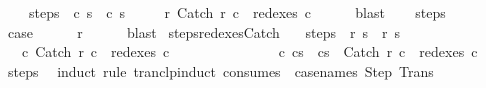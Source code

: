 \begin{isabellebody}
\ \ \ \ steps{\isacharcolon}\ {\isachardoublequoteopen}{\isasymGamma}{\isasymturnstile}\ {\isacharparenleft}c{\isacharprime}{\isacharcomma}\ s{\isacharprime}{\isacharprime}{\isacharparenright}\ {\isasymrightarrow}\isactrlsup {\isacharasterisk}\ {\isacharparenleft}c{\isacharprime}{\isacharprime}{\isacharcomma}\ s{\isacharprime}{\isacharparenright}{\isachardoublequoteclose}\ \isanewline
\ \ \ \ r{\isacharprime}{\isacharcolon}\ {\isachardoublequoteopen}Catch\ r{\isacharprime}\ c\ {\isasymin}\ redexes\ c{\isacharprime}{\isacharprime}{\isachardoublequoteclose}\isanewline
\ \ \ \ \isamarkupfalse%
\ blast\isanewline
\ \ \isamarkupfalse%
\ steps\isanewline
\ \ \isamarkupfalse%
\isanewline
\ \ \isamarkupfalse%
\ {\isacharquery}case\isanewline
\ \ \ \ \isamarkupfalse%
\ r{\isacharprime}\isanewline
\ \ \ \ \isamarkupfalse%
\ blast\isanewline
{}\isamarkupfalse%
%
\endisatagproof
{\isafoldproof}%
%
\isadelimproof
\isanewline
%
\endisadelimproof
\isanewline
{}\isamarkupfalse%
\ steps{\isacharunderscore}redexes{\isacharunderscore}Catch{\isacharprime}{\isacharcolon}\isanewline
\ \ \ steps{\isacharcolon}\ {\isachardoublequoteopen}{\isasymGamma}{\isasymturnstile}\ {\isacharparenleft}r{\isacharcomma}\ s{\isacharparenright}\ {\isasymrightarrow}\isactrlsup {\isacharplus}\ {\isacharparenleft}r{\isacharprime}{\isacharcomma}\ s{\isacharprime}{\isacharparenright}{\isachardoublequoteclose}\isanewline
\ \ \ {\isachardoublequoteopen}{\isasymAnd}c{\isachardot}\ Catch\ r\ c\ {\isasymin}\ redexes\ c\ \isanewline
\ \ \ \ \ \ \ \ \ \ \ \ \ {\isasymLongrightarrow}\ {\isasymexists}c{\isacharprime}{\isachardot}\ {\isasymGamma}{\isasymturnstile}{\isacharparenleft}c{\isacharcomma}s{\isacharparenright}\ {\isasymrightarrow}\isactrlsup {\isacharplus}\ {\isacharparenleft}c{\isacharprime}{\isacharcomma}s{\isacharprime}{\isacharparenright}\ {\isasymand}\ Catch\ r{\isacharprime}\ c\ {\isasymin}\ redexes\ c{\isacharprime}{\isachardoublequoteclose}\isanewline
%
\isadelimproof
%
\endisadelimproof
%
\isatagproof
{}\isamarkupfalse%
\ steps\ \isanewline
{}\isamarkupfalse%
\ {\isacharparenleft}induct\ rule{\isacharcolon}\ tranclp{\isacharunderscore}induct{}\ {\isacharbrackleft}consumes\ {}{\isacharcomma}\ case{\isacharunderscore}names\ Step\ Trans{\isacharbrackright}{\isacharparenright}\isanewline

\end{isabellebody}
